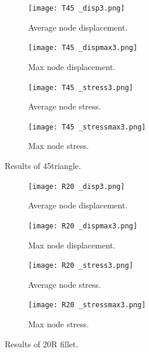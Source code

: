 \documentclass[../main.tex]{subfiles}
\begin{document}
\begin{figure}
  \centering 
  \begin{subfigure}[b]{0.45\textwidth}
    \centering 
    \texttt{[image: T45 \_disp3.png]}
    \caption{Average node displacement.}
    \label{}
  \end{subfigure}
  \begin{subfigure}[b]{0.45\textwidth}
    \centering 
    \texttt{[image: T45 \_dispmax3.png]}
    \caption{Max node displacement.}
    \label{}
  \end{subfigure}
  \begin{subfigure}[b]{0.45\textwidth}
    \centering 
    \texttt{[image: T45 \_stress3.png]}
    \caption{Average node stress.}
    \label{}
  \end{subfigure}
  \begin{subfigure}[b]{0.45\textwidth}
    \centering 
    \texttt{[image: T45 \_stressmax3.png]}
    \caption{Max node stress.}
    \label{}
  \end{subfigure}
  \caption{Results of 45\degree triangle.}
\end{figure}

\begin{figure}[h!]
  \centering 
  \begin{subfigure}[b]{0.45\textwidth}
    \centering 
    \texttt{[image: R20 \_disp3.png]}
    \caption{Average node displacement.}
    \label{}
  \end{subfigure}
  \begin{subfigure}[b]{0.45\textwidth}
    \centering 
    \texttt{[image: R20 \_dispmax3.png]}
    \caption{Max node displacement.}
    \label{}
  \end{subfigure}
  \begin{subfigure}[b]{0.45\textwidth}
    \centering 
    \texttt{[image: R20 \_stress3.png]}
    \caption{Average node stress.}
    \label{}
  \end{subfigure}
  \begin{subfigure}[b]{0.45\textwidth}
    \centering 
    \texttt{[image: R20 \_stressmax3.png]}
    \caption{Max node stress.}
    \label{}
  \end{subfigure}
  \caption{Results of 20R fillet.}
\end{figure}
\end{document}
